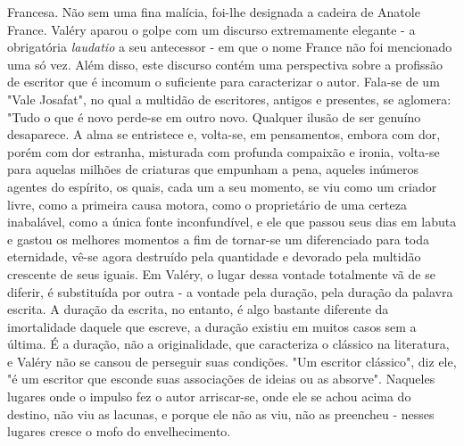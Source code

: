 Francesa. Não sem uma fina malícia, foi-lhe designada a cadeira de
Anatole France. Valéry aparou o golpe com um discurso extremamente
elegante - a obrigatória \emph{laudatio} a seu antecessor - em que o
nome France não foi mencionado uma só vez. Além disso, este discurso
contém uma perspectiva sobre a profissão de escritor que é incomum o
suficiente para caracterizar o autor. Fala-se de um "Vale Josafat", no
qual a multidão de escritores, antigos e presentes, se aglomera: "Tudo o
que é novo perde-se em outro novo. Qualquer ilusão de ser genuíno
desaparece. A alma se entristece e, volta-se, em pensamentos, embora com
dor, porém com dor estranha, misturada com profunda compaixão e ironia,
volta-se para aquelas milhões de criaturas que empunham a pena, aqueles
inúmeros agentes do espírito, os quais, cada um a seu momento, se viu
como um criador livre, como a primeira causa motora, como o proprietário
de uma certeza inabalável, como a única fonte inconfundível, e ele que
passou seus dias em labuta e gastou os melhores momentos a fim de
tornar-se um diferenciado para toda eternidade, vê-se agora destruído
pela quantidade e devorado pela multidão crescente de seus iguais. Em
Valéry, o lugar dessa vontade totalmente vã de se diferir, é substituída
por outra - a vontade pela duração, pela duração da palavra escrita. A
duração da escrita, no entanto, é algo bastante diferente da
imortalidade daquele que escreve, a duração existiu em muitos casos sem
a última. É a duração, não a originalidade, que caracteriza o clássico
na literatura, e Valéry não se cansou de perseguir suas condições. "Um
escritor clássico", diz ele, "é um escritor que esconde suas associações
de ideias ou as absorve". Naqueles lugares onde o impulso fez o autor
arriscar-se, onde ele se achou acima do destino, não viu as lacunas, e
porque ele não as viu, não as preencheu - nesses lugares cresce o mofo
do envelhecimento.

